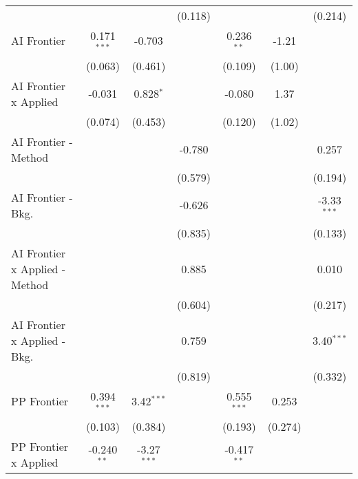 \begin{tabular}{lcccccc}
                                  &                &               & (0.118)        &                &              & (0.214)\\   
   AI Frontier                    & 0.171$^{***}$  & -0.703        &                & 0.236$^{**}$   & -1.21        &   \\   
                                  & (0.063)        & (0.461)       &                & (0.109)        & (1.00)       &   \\   
   AI Frontier x Applied          & -0.031         & 0.828$^{*}$   &                & -0.080         & 1.37         &   \\   
                                  & (0.074)        & (0.453)       &                & (0.120)        & (1.02)       &   \\   
   AI Frontier - Method           &                &               & -0.780         &                &              & 0.257\\   
                                  &                &               & (0.579)        &                &              & (0.194)\\   
   AI Frontier - Bkg.             &                &               & -0.626         &                &              & -3.33$^{***}$\\   
                                  &                &               & (0.835)        &                &              & (0.133)\\   
   AI Frontier x Applied - Method &                &               & 0.885          &                &              & 0.010\\   
                                  &                &               & (0.604)        &                &              & (0.217)\\   
   AI Frontier x Applied - Bkg.   &                &               & 0.759          &                &              & 3.40$^{***}$\\   
                                  &                &               & (0.819)        &                &              & (0.332)\\   
   PP Frontier                    & 0.394$^{***}$  & 3.42$^{***}$  &                & 0.555$^{***}$  & 0.253        &   \\   
                                  & (0.103)        & (0.384)       &                & (0.193)        & (0.274)      &   \\   
   PP Frontier x Applied          & -0.240$^{**}$  & -3.27$^{***}$ &                & -0.417$^{**}$  &              &   \\   

\end{tabular}
